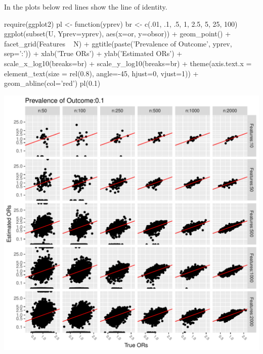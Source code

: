 In the plots below red lines show the line of identity.

\begin{Schunk}
\begin{Sinput}
require(ggplot2)
pl <- function(yprev) {
  br <- c(.01, .1, .5, 1, 2.5, 5, 25, 100)
  ggplot(subset(U, Yprev=yprev),
         aes(x=or, y=obsor)) + geom_point() + facet_grid(Features ~ N) +
         ggtitle(paste('Prevalence of Outcome', yprev, sep=':')) +
         xlab('True ORs') + ylab('Estimated ORs') +
         scale_x_log10(breaks=br) + scale_y_log10(breaks=br) +
         theme(axis.text.x = element_text(size = rel(0.8), angle=-45,
                                    hjust=0, vjust=1)) +
         geom_abline(col='red')
}
pl(0.1)
\end{Sinput}


\centerline{\includegraphics[width=\maxwidth]{hdata-simor-plot-1} }

\end{Schunk}

